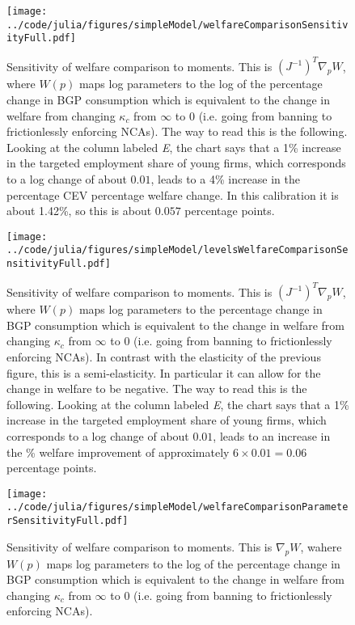 \documentclass[11pt,english]{article}
\theoremstyle{remark}
\begin{document}
\begin{figure}[]
	\texttt{[image: ../code/julia/figures/simpleModel/welfareComparisonSensitivityFull.pdf]}
	\caption{Sensitivity of welfare comparison to moments. This is $(J^{-1})^T \nabla_p W$, where $W(p)$ maps log parameters to the log of the percentage change in BGP consumption which is equivalent to the change in welfare from changing $\kappa_c$ from $\infty$ to $0$ (i.e. going from banning to frictionlessly enforcing NCAs). The way to read this is the following. Looking at the column labeled \textit{E}, the chart says that a 1\% increase in the targeted employment share of young firms, which corresponds to a log change of about $0.01$, leads to a 4\% increase in the percentage CEV percentage welfare change. In this calibration it is about 1.42\%, so this is about $0.057$ percentage points.}
	\label{welfareComparisonSensitivityFull}
\end{figure}

\begin{figure}[]
	\texttt{[image: ../code/julia/figures/simpleModel/levelsWelfareComparisonSensitivityFull.pdf]}
	\caption{Sensitivity of welfare comparison to moments. This is $(J^{-1})^T \nabla_p W$, where $W(p)$ maps log parameters to the percentage change in BGP consumption which is equivalent to the change in welfare from changing $\kappa_c$ from $\infty$ to $0$ (i.e. going from banning to frictionlessly enforcing NCAs). In contrast with the elasticity of the previous figure, this is a semi-elasticity. In particular it can allow for the change in welfare to be negative. The way to read this is the following. Looking at the column labeled \textit{E}, the chart says that a 1\% increase in the targeted employment share of young firms, which corresponds to a log change of about $0.01$, leads to an increase in the \% welfare improvement of approximately $6 \times 0.01 = 0.06$ percentage points.}
	\label{levelsWelfareComparisonSensitivityFull}
\end{figure}

\begin{figure}[]
	\texttt{[image: ../code/julia/figures/simpleModel/welfareComparisonParameterSensitivityFull.pdf]}
	\caption{Sensitivity of welfare comparison to moments. This is $\nabla_p W$, wahere $W(p)$ maps log parameters to the log of the percentage change in BGP consumption which is equivalent to the change in welfare from changing $\kappa_c$ from $\infty$ to $0$ (i.e. going from banning to frictionlessly enforcing NCAs).}
	\label{welfareComparisonParameterSensitivityFull}
\end{figure}
\end{document}
